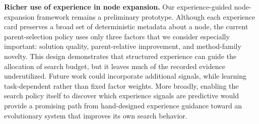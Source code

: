 \textbf{Richer use of experience in node expansion.}
Our experience-guided node-expansion framework remains a preliminary
prototype. Although each experience card preserves a broad set of
deterministic metadata about a node, the current parent-selection policy uses only three
factors that we consider especially important: solution quality,
parent-relative improvement, and method-family novelty. This design
demonstrates that structured experience can guide the allocation of search
budget, but it leaves much of the recorded evidence underutilized. Future
work could incorporate additional signals, while learning task-dependent rather than fixed
factor weights. More broadly, enabling the search policy itself to discover
which experience signals are predictive would provide a promising path from
hand-designed experience guidance toward an evolutionary system that
improves its own search behavior.

